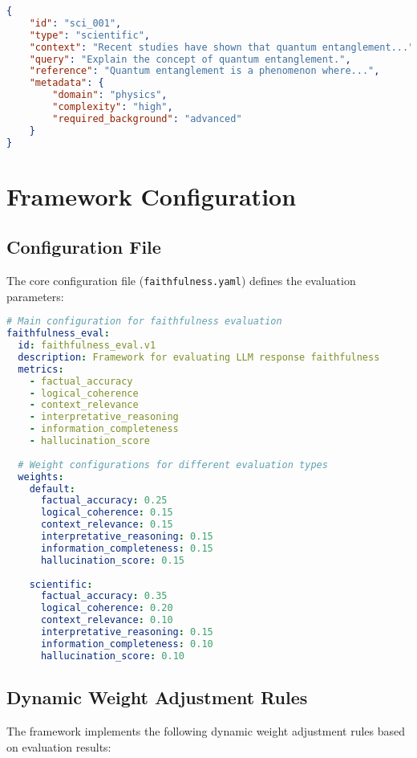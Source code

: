 \begin{lstlisting}[language=JSON, breaklines=true, basicstyle=\ttfamily\scriptsize, commentstyle=\color{gray}]
{
    "id": "sci_001",
    "type": "scientific",
    "context": "Recent studies have shown that quantum entanglement...",
    "query": "Explain the concept of quantum entanglement.",
    "reference": "Quantum entanglement is a phenomenon where...",
    "metadata": {
        "domain": "physics",
        "complexity": "high",
        "required_background": "advanced"
    }
}
\end{lstlisting}

\section{Framework Configuration}

\subsection{Configuration File}
The core configuration file (\texttt{faithfulness.yaml}) defines the evaluation parameters:

\begin{lstlisting}[language=YAML, breaklines=true, basicstyle=\ttfamily\scriptsize, commentstyle=\color{gray}]
# Main configuration for faithfulness evaluation
faithfulness_eval:
  id: faithfulness_eval.v1
  description: Framework for evaluating LLM response faithfulness
  metrics:
    - factual_accuracy
    - logical_coherence
    - context_relevance
    - interpretative_reasoning
    - information_completeness
    - hallucination_score
  
  # Weight configurations for different evaluation types
  weights:
    default:
      factual_accuracy: 0.25
      logical_coherence: 0.15
      context_relevance: 0.15
      interpretative_reasoning: 0.15
      information_completeness: 0.15
      hallucination_score: 0.15
    
    scientific:
      factual_accuracy: 0.35
      logical_coherence: 0.20
      context_relevance: 0.10
      interpretative_reasoning: 0.15
      information_completeness: 0.10
      hallucination_score: 0.10
\end{lstlisting}

\subsection{Dynamic Weight Adjustment Rules}
The framework implements the following dynamic weight adjustment rules based on evaluation results:

